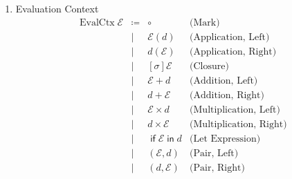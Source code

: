 \documentclass{article}
\newcommand{\matches}{\mathrel{\mathop{\sim}}}
\newcommand{\steps}{\mathrel{\mathop{\vartriangleright}}}
\newcommand{\skips}{\mathrel{\mathop{\blacktriangleright}}}
\newcommand{\class}[1]{\operatorname{#1}}
\newcommand{\fin}{\mathrel{\mathop{\mathsf{in}}}}
\newcommand{\flet}{\operatorname{\mathsf{let}}}
\newcommand{\fif}{\operatorname{\mathsf{if}}}
\begin{document}
\begin{enumerate}
    \[
      \begin{prooftree}
        \hypo{(f, step) \in \mathcal{F}}
        \hypo{f \matches d}
        \infer2[(FE-Step)]{\mathcal{F} \steps d}
      \end{prooftree}
      \quad
      \begin{prooftree}
        \hypo{(f, skip) \in \mathcal{F}}
        \hypo{f \matches d}
        \infer2[(FE-Skip)]{\mathcal{F} \skips d}
      \end{prooftree}
    \]
    \[
      \begin{prooftree}
        \hypo{\mathcal{F} = \mathcal{F}_1,\mathcal{F}_2}
        \hypo{\mathcal{F}_1 \skips d}
        \hypo{\mathcal{F}_2 \steps d}
        \infer3[(FE-Skip)]{\mathcal{F} \steps d}
      \end{prooftree}
      \quad
      \begin{prooftree}
        \hypo{\mathcal{F} = \mathcal{F}_1,\mathcal{F}_2}
        \hypo{\mathcal{F}_1 \steps d}
        \hypo{\mathcal{F}_2 \skips d}
        \infer3[(FE-Step)]{\mathcal{F} \skips d}
      \end{prooftree}
    \]
  \item \fbox{\(\class{EvalCtx} \mathcal{E}\)} Evaluation Context
    \[
      \begin{array}{rcll}
        \class{EvalCtx} \mathcal{E}
        &\coloneqq& \circ & \text{(Mark)}\\
        &\mid& \mathcal{E} (d) & \text{(Application, Left)} \\
        &\mid& d (\mathcal{E}) & \text{(Application, Right)} \\
        &\mid& [\sigma] \mathcal{E} & \text{(Closure)} \\
        &\mid& \mathcal{E} + d & \text{(Addition, Left)} \\
        &\mid& d + \mathcal{E} & \text{(Addition, Right)} \\
        &\mid& \mathcal{E} \times d & \text{(Multiplication, Left)} \\
        &\mid& d \times \mathcal{E} & \text{(Multiplication, Right)} \\
        &\mid& \fif \mathcal{E} \fin d & \text{(Let Expression)} \\
        &\mid& (\mathcal{E}, d) & \text{(Pair, Left)} \\
        &\mid& (d, \mathcal{E}) & \text{(Pair, Right)} \\

\end{array}\]
\end{enumerate}
\end{document}
